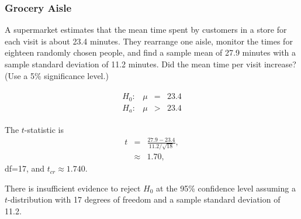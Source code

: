 \begin{frame}
  \frametitle{Grocery Aisle}

  \vspace*{-1em}

  A supermarket estimates that the mean time spent by customers in a
  store for each visit is about 23.4 minutes. They rearrange one
  aisle, monitor the times for eighteen randomly chosen people, and
  find a sample mean of 27.9 minutes with a {\color{red} sample
    standard deviation} of 11.2 minutes. Did the mean time per visit
  increase? (Use a 5\% significance level.)

  \vspace*{-1em}

    \begin{eqnarray*}
      \begin{array}{lrcl}
        H_0: & \mu & = & 23.4 \\
        H_a: & \mu & > & 23.4
      \end{array}
    \end{eqnarray*}

    The $t$-statistic is 
    \begin{eqnarray*}
      t & = & \frac{27.9-23.4}{11.2/\sqrt{18}}, \\
      & \approx & 1.70,
    \end{eqnarray*}
    df=17, and $t_{cr}\approx 1.740$.

    \vfill

    {

      {\color{red}
        There is insufficient evidence to reject $H_0$ at the 95\%
        confidence level assuming a $t$-distribution with 17 degrees of
        freedom and a {\color{red}sample standard deviation} of 11.2.
      }

    }

  \end{frame}


